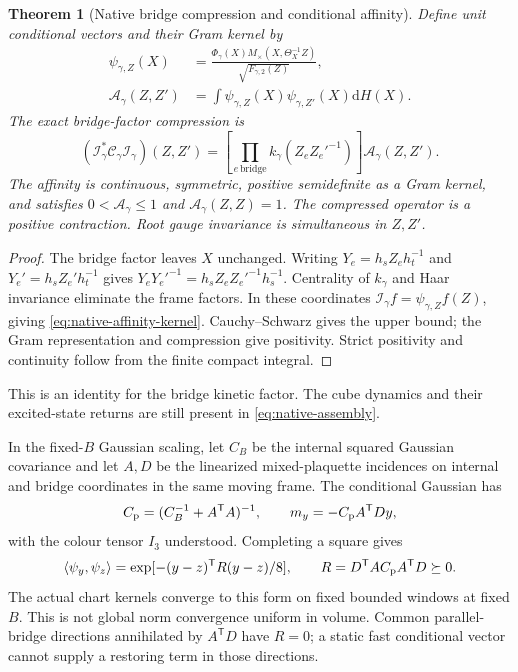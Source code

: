 \documentclass[11pt,oneside,openany]{book}
\newtheorem{theorem}{Theorem}[chapter]
\theoremstyle{definition}
\theoremstyle{remark}
\newcommand{\dd}{\mathrm d}
\begin{document}
\begin{theorem}[Native bridge compression and conditional affinity]
\label{thm:native-affinity}
Define unit conditional vectors and their Gram kernel by
\begin{align*}
 \psi_{\gamma,Z}(X)&=
 \frac{\Phi_\gamma(X)M_\times(X,\Theta_X^{-1}Z)}
                    {\sqrt{F_{\gamma,2}(Z)}},\\
 \mathcal A_\gamma(Z,Z')&=
            \int\psi_{\gamma,Z}(X)\psi_{\gamma,Z'}(X)\dd H(X).
\end{align*}
The exact bridge-factor compression is
\begin{equation}
 (\mathcal I_\gamma^*\mathcal C_\gamma\mathcal I_\gamma)(Z,Z')
     =\left[\prod_{e\,\mathrm{bridge}}k_\gamma(Z_eZ_e'^{-1})\right]
                               \mathcal A_\gamma(Z,Z').
 \label{eq:native-affinity-kernel}
\end{equation}
The affinity is continuous, symmetric, positive semidefinite as a
Gram kernel, and satisfies $0<\mathcal A_\gamma\le1$ and
$\mathcal A_\gamma(Z,Z)=1$. The compressed operator is a positive
contraction. Root gauge invariance is simultaneous in $Z,Z'$.
\end{theorem}
\begin{proof}
The bridge factor leaves $X$ unchanged. Writing
$Y_e=h_sZ_eh_t^{-1}$ and $Y_e'=h_sZ_e'h_t^{-1}$ gives
$Y_eY_e'^{-1}=h_sZ_eZ_e'^{-1}h_s^{-1}$. Centrality of $k_\gamma$
and Haar invariance eliminate the frame factors. In these coordinates
$\mathcal I_\gamma f=\psi_{\gamma,Z}f(Z)$, giving
\cref{eq:native-affinity-kernel}. Cauchy--Schwarz gives the upper bound;
the Gram representation and compression give positivity. Strict
positivity and continuity follow from the finite compact integral.
\end{proof}
This is an identity for the bridge kinetic factor. The cube dynamics
and their excited-state returns are still present in
\cref{eq:native-assembly}.

In the fixed-$B$ Gaussian scaling, let $C_B$ be the internal squared
Gaussian covariance and let $A,D$ be the linearized mixed-plaquette
incidences on internal and bridge coordinates in the same moving
frame. The conditional Gaussian has
\[
 C_{\rm p}=(C_B^{-1}+A^{\mathsf T}A)^{-1},\qquad
 m_y=-C_{\rm p}A^{\mathsf T}Dy,
\]
with the colour tensor $I_3$ understood. Completing a square gives
\begin{equation}
 \langle\psi_y,\psi_z\rangle
       =\exp[-(y-z)^{\mathsf T}R(y-z)/8],\qquad
 R=D^{\mathsf T}AC_{\rm p}A^{\mathsf T}D\succeq0.
 \label{eq:native-Gaussian-affinity}
\end{equation}
The actual chart kernels converge to this form on fixed bounded
windows at fixed $B$. This is not global norm convergence uniform in
volume. Common parallel-bridge directions annihilated by
$A^{\mathsf T}D$ have $R=0$; a static fast conditional vector cannot
supply a restoring term in those directions.
\end{document}
